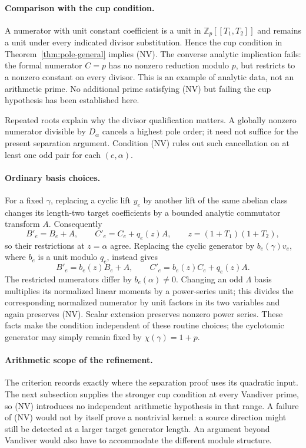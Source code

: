 \paragraph{Comparison with the cup condition.}
A numerator with unit constant coefficient is a unit in $\mathbb Z_p[[T_1,T_2]]$ and remains a unit under every indicated divisor substitution. Hence the cup condition in Theorem~\ref{thm:pole-general} implies (NV). The converse analytic implication fails: the formal numerator $C=p$ has no nonzero reduction modulo $p$, but restricts to a nonzero constant on every divisor. This is an example of analytic data, not an arithmetic prime. No additional prime satisfying (NV) but failing the cup hypothesis has been established here.

Repeated roots explain why the divisor qualification matters. A globally nonzero numerator divisible by $D_\alpha$ cancels a highest pole order; it need not suffice for the present separation argument. Condition (NV) rules out such cancellation on at least one odd pair for each $(e,\alpha)$.

\paragraph{Ordinary basis choices.}
For a fixed $\gamma$, replacing a cyclic lift $y_e$ by another lift of the same abelian class changes its length-two target coefficients by a bounded analytic commutator transform $A$. Consequently
\[
 B'_e=B_e+A,\qquad C'_e=C_e+q_e(z)A,
 \qquad z=(1+T_1)(1+T_2),
\]
so their restrictions at $z=\alpha$ agree. Replacing the cyclic generator by $b_e(\gamma)v_e$, where $b_e$ is a unit modulo $q_e$, instead gives
\[
 B'_e=b_e(z)B_e+A,\qquad
 C'_e=b_e(z)C_e+q_e(z)A.
\]
The restricted numerators differ by $b_e(\alpha)\ne0$. Changing an odd $\Lambda$ basis multiplies its normalized linear moments by a power-series unit; this divides the corresponding normalized numerator by unit factors in its two variables and again preserves (NV). Scalar extension preserves nonzero power series. These facts make the condition independent of these routine choices; the cyclotomic generator may simply remain fixed by $\chi(\gamma)=1+p$.

\paragraph{Arithmetic scope of the refinement.}
The criterion records exactly where the separation proof uses its
quadratic input. The next subsection supplies the stronger cup
condition at every Vandiver prime, so (NV) introduces no independent
arithmetic hypothesis in that range. A failure of (NV) would not by
itself prove a nontrivial kernel: a source direction might still be
detected at a larger target generator length. An argument beyond
Vandiver would also have to accommodate the different module structure.
